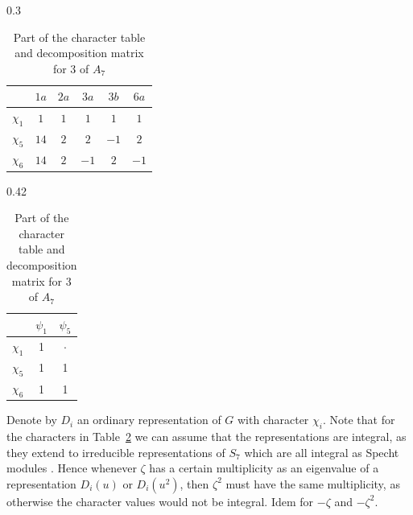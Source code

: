 \documentclass[10pt,a4paper,reqno]{amsart}
\theoremstyle{definition}
\theoremstyle{remark}
\begin{document}
{\begin{table}[h]%
\caption{Part of the character table and decomposition matrix for $3$ of $A_7$}\label{tablePrincipalBlock3}\centering
\begin{subtable}[c]{0.3\textwidth} \centering
{}
\begin{tabular}{l c c c c c} \hline
{ } & $1a$ & $2a$ & $3a$ & $3b$ & $6a$ \\ \hline \hline
$\chi_{1}$ & $1$ & $1$ & $1$ & $1$ & $1$  \\
$\chi_{5}$ & $14$ & $2$ & $2$ & $-1$ & $2$  \\
$\chi_{6}$ & $14$ & $2$ & $-1$ & $2$ & $-1$ \\ \hline
\end{tabular}
\end{subtable}
\qquad
\begin{subtable}[c]{0.42\textwidth} \centering
{}
\begin{tabular}{l c c} \hline
{ } & $\psi_{1}$  & $\psi_{5}$  \\ \hline\hline
$\chi_{1}$ & 1 & $\cdot$  \\
$\chi_{5}$ & 1 &  1 \\
$\chi_{6}$ & 1 & 1 \\ \hline
\end{tabular}
\end{subtable}
\end{table}

Denote by $D_i$ an ordinary representation of $G$ with character $\chi_i$. Note that for the characters in Table~\ref{tablePrincipalBlock3} we can assume that the representations are integral, as they extend to irreducible representations of $S_7$ which are all integral as Specht modules \cite[Theorem 4.12]{Jam86}. Hence whenever $\zeta$ has a certain multiplicity as an eigenvalue of a representation $D_i(u)$ or $D_i(u^2)$, then $\zeta^2$ must have the same multiplicity, as otherwise the character values would not be integral. Idem for $-\zeta$ and $-\zeta^2$.

}
\end{document}
